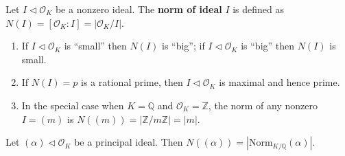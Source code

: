 \begin{definition}
    Let $I\lhd \mathcal{O}_{K}$ be a nonzero ideal. The {\bf norm of ideal} $I$ is defined as $N(I)=[\mathcal{O}_{K}:I]=\left| \mathcal{O}_{K} /I \right| $. 
\end{definition}

\begin{remark}
    \begin{enumerate}
        \item If $I\lhd \mathcal{O}_{K}$ is ``small'' then $N(I)$ is ``big''; if $I\lhd \mathcal{O}_{K}$ is ``big'' then $N(I)$ is small. 
        \item If $N(I)=p$ is a rational prime, then $I\lhd \mathcal{O}_{K}$ is maximal and hence prime. 
        \item In the special case when $K=\mathbb{Q}$ and $\mathcal{O}_{K}=\mathbb{Z}$, the norm of any nonzero $I=(m)$ is $N((m))=\left| \mathbb{Z} /m\mathbb{Z} \right| =|m|$. 
    \end{enumerate}
\end{remark}

\begin{proposition}
    Let $(\alpha)\lhd \mathcal{O}_{K}$ be a principal ideal. Then $N((\alpha))=\left| \mathrm{Norm}_{K /\mathbb{Q}}(\alpha) \right| $. 
\end{proposition}

